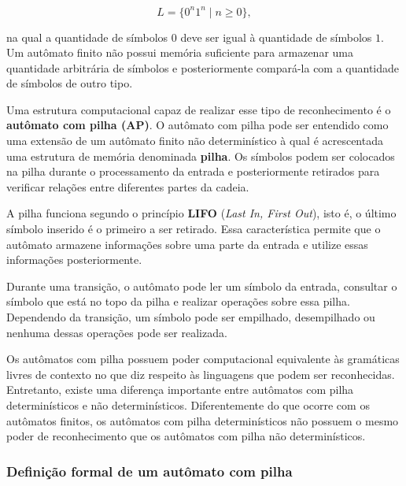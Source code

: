 \documentclass[
  brazilian,
  letterpaper,
]{book}
\theoremstyle{plain}
\theoremstyle{definition}
\theoremstyle{remark}
\begin{document}
\[
L=\{0^n1^n\mid n\geq 0\},
\]

na qual a quantidade de símbolos \(0\) deve ser igual à quantidade de
símbolos \(1\). Um autômato finito não possui memória suficiente para
armazenar uma quantidade arbitrária de símbolos e posteriormente
compará-la com a quantidade de símbolos de outro tipo.

Uma estrutura computacional capaz de realizar esse tipo de
reconhecimento é o \textbf{autômato com pilha (AP)}. O autômato com
pilha pode ser entendido como uma extensão de um autômato finito não
determinístico à qual é acrescentada uma estrutura de memória denominada
\textbf{pilha}. Os símbolos podem ser colocados na pilha durante o
processamento da entrada e posteriormente retirados para verificar
relações entre diferentes partes da cadeia.

A pilha funciona segundo o princípio \textbf{LIFO} (\emph{Last In, First
Out}), isto é, o último símbolo inserido é o primeiro a ser retirado.
Essa característica permite que o autômato armazene informações sobre
uma parte da entrada e utilize essas informações posteriormente.

Durante uma transição, o autômato pode ler um símbolo da entrada,
consultar o símbolo que está no topo da pilha e realizar operações sobre
essa pilha. Dependendo da transição, um símbolo pode ser empilhado,
desempilhado ou nenhuma dessas operações pode ser realizada.

Os autômatos com pilha possuem poder computacional equivalente às
gramáticas livres de contexto no que diz respeito às linguagens que
podem ser reconhecidas. Entretanto, existe uma diferença importante
entre autômatos com pilha determinísticos e não determinísticos.
Diferentemente do que ocorre com os autômatos finitos, os autômatos com
pilha determinísticos não possuem o mesmo poder de reconhecimento que os
autômatos com pilha não determinísticos.

\subsubsection{Definição formal de um autômato com
pilha}\label{definiuxe7uxe3o-formal-de-um-autuxf4mato-com-pilha}
\end{document}
